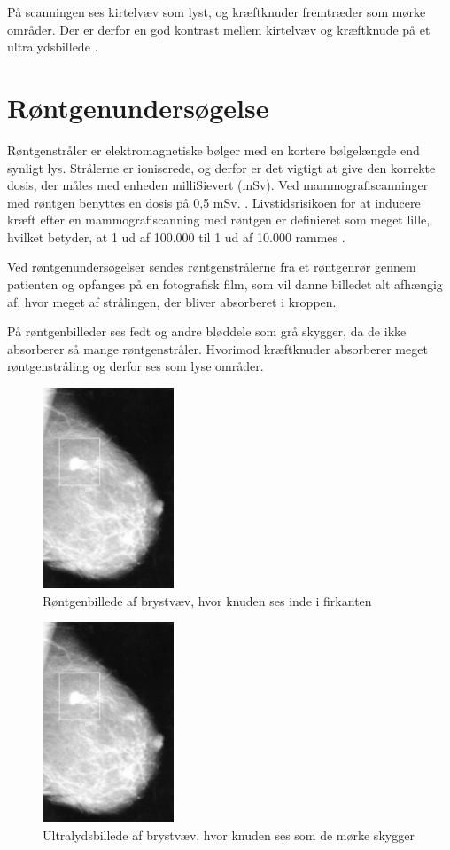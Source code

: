 På scanningen ses kirtelvæv som lyst, og kræftknuder fremtræder som mørke områder.  Der er derfor en god kontrast mellem kirtelvæv og kræftknude på et ultralydsbillede \citep{Ultralyd}.

\section{Røntgenundersøgelse}
Røntgenstråler er elektromagnetiske bølger med en kortere bølgelængde end synligt lys. Strålerne er ioniserede, og derfor er det vigtigt at give den korrekte dosis, der måles med enheden milliSievert (mSv). Ved mammografiscanninger med røntgen benyttes en dosis på 0,5 mSv. \cite{Sundhedsstyrelsen}. Livstidsrisikoen for at inducere kræft efter en mammografiscanning med røntgen er definieret som meget lille, hvilket betyder, at 1 ud af 100.000 til 1 ud af 10.000 rammes \cite{Risk}. 

Ved røntgenundersøgelser sendes røntgenstrålerne fra et røntgenrør gennem patienten og opfanges på en fotografisk film, som vil danne billedet alt afhængig af, hvor meget af strålingen, der bliver absorberet i kroppen. \cite{Rontgenundersogelse}

På røntgenbilleder ses fedt og andre bløddele som grå skygger, da de ikke absorberer så mange røntgenstråler. Hvorimod kræftknuder absorberer meget røntgenstråling og derfor ses som lyse områder. \cite{Rontgenundersogelse}


\begin{figure}[H]
    \centering
    \includegraphics[width=0.35\textwidth]{figurer/r/rontgen}
    \caption{Røntgenbillede af brystvæv, hvor knuden ses inde i firkanten \cite{Mammografi}}
    \label{rontgen}
\end{figure}

\begin{figure}[H]
    \centering
    \includegraphics[width=0.35\textwidth]{figurer/r/rontgen}
    \caption{Ultralydsbillede af brystvæv, hvor knuden ses som de mørke skygger \cite{Ultralyd}}
    \label{ultralyd}
\end{figure}